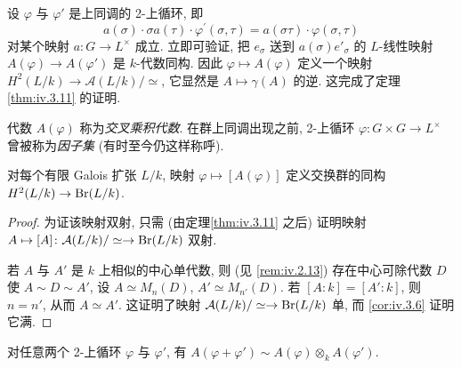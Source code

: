 设 $\varphi$ 与 $\varphi'$ 是上同调的 2-上循环, 即
\[
a(\sigma)\cdot\sigma a(\tau)\cdot\varphi^{\prime}(\sigma,\tau)=a(\sigma\tau)\cdot\varphi(\sigma,\tau)
\]
对某个映射 $a\colon G\to L^{\times}$ 成立. 立即可验证, 把 $e_\sigma$ 送到 $a(\sigma)e'_\sigma$ 的 $L$-线性映射 $A(\varphi)\to A(\varphi')$ 是 $k$-代数同构. 因此 $\varphi\mapsto A(\varphi)$ 定义一个映射 $H^2(L/k)\to\mathcal{A}(L/k)/\simeq$, 它显然是 $A\mapsto\gamma(A)$ 的逆. 这完成了定理\ref{thm:iv.3.11} 的证明.

代数 $A(\varphi)$ 称为\emph{交叉乘积代数}. 在群上同调出现之前, 2-上循环 $\varphi\colon G\times G\to L^{\times}$ 曾被称为\emph{因子集} (有时至今仍这样称呼).

\begin{theorem}\label{thm:iv.3.14}
对每个有限 Galois 扩张 $L/k$, 映射 $\varphi\mapsto[A(\varphi)]$ 定义交换群的同构 $H^2(L/k)\to\operatorname{Br}(L/k)$.
\end{theorem}

\begin{proof}
为证该映射双射, 只需 (由定理\ref{thm:iv.3.11} 之后) 证明映射 $A\mapsto[A]\colon\mathcal{A}(L/k)/\simeq\to\operatorname{Br}(L/k)$ 双射.

若 $A$ 与 $A'$ 是 $k$ 上相似的中心单代数, 则 (见 \ref{rem:iv.2.13}) 存在中心可除代数 $D$ 使 $A\sim D\sim A'$, 设 $A\simeq M_n(D)$, $A'\simeq M_{n'}(D)$. 若 $[A:k]=[A':k]$, 则 $n=n'$, 从而 $A\simeq A'$. 这证明了映射 $\mathcal{A}(L/k)/\simeq\to\operatorname{Br}(L/k)$ 单, 而 \ref{cor:iv.3.6} 证明它满.
\end{proof}

\begin{lemma}\label{lem:iv.3.15}
对任意两个 2-上循环 $\varphi$ 与 $\varphi'$, 有 $A(\varphi+\varphi')\sim A(\varphi)\otimes_k A(\varphi')$.
\end{lemma}


